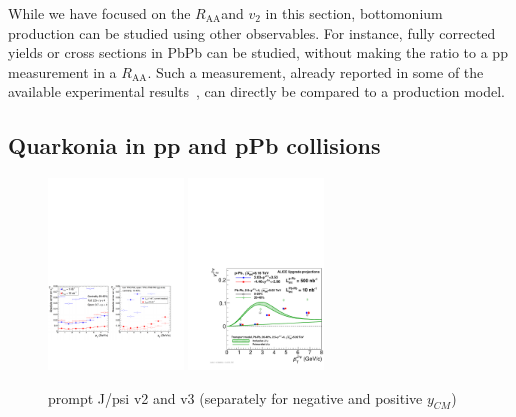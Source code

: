 \documentclass[../report.tex]{subfiles}
\providecommand{\raa}{\ensuremath{R_\text{AA}}\Xspace}
\begin{document}
While we have focused on the \raa and $v_2$ in this section, bottomonium production can be studied using other observables. For instance, fully corrected yields or cross sections
in PbPb can be studied, without making the ratio to a pp measurement in a \raa. Such a measurement, already reported in some of the available experimental results~\cite{Sirunyan:2018nsz},
can directly be compared to a production model. 


\clearpage

\subsection{Quarkonia in pp and pPb collisions}

\begin{figure}
 \begin{center}
  \includegraphics[width=0.32\textwidth]{fig/alice/alice_jpsi_v2_projected.pdf}
  \includegraphics[width=0.32\textwidth]{fig/alice/alice_jpsi_v2_projected2.pdf}
 \end{center}

 \caption{prompt J/psi v2 and v3 (separately for negative and positive $y_{CM}$)}
\end{figure}
\end{document}

